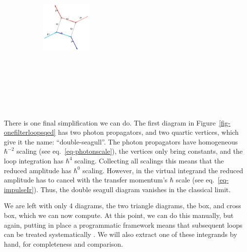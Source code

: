 \documentclass[
  11pt,
  a4paper,
  DIV=11,
  numbers=noendperiod,
  oneside]{scrreprt}
\DeclareRobustCommand{\[}{\begin{equation}}
\DeclareRobustCommand{\]}{\end{equation}}
\begin{document}
\begin{figure}
\begin{minipage}[t]{0.20\linewidth}
{\begin{figure}[H]
{}

\end{figure}

}

\end{minipage}%
%
\begin{minipage}[t]{0.20\linewidth}

{\centering 

\begin{figure}[H]

{\centering \includegraphics[width=1in,height=3.5in]{./scattering_files/figure-latex/dot-figure-5.png}

}

\end{figure}

}

\end{minipage}%

\end{figure}

There is one final simplification we can do. The first diagram in
Figure~\ref{fig-onefilterloopsqed} has two photon propagators, and two
quartic vertices, which give it the name: ``double-seagull''. The photon
propagators have homogeneous \(\hbar^{-2}\) scaling (see
eq.~\ref{eq-photonscale}), the vertices only bring constants, and the
loop integration has \(\hbar^4\) scaling. Collecting all scalings this
means that the reduced amplitude has \(\hbar^0\) scaling. However, in
the virtual integrand the reduced amplitude has to cancel with the
transfer momentum's \(\hbar\) scale (see eq.~\ref{eq-impulseIr}). Thus,
the double seagull diagram vanishes in the classical limit.

We are left with only 4 diagrams, the two triangle diagrams, the box,
and cross box, which we can now compute. At this point, we can do this
manually, but again, putting in place a programmatic framework means
that subsequent loops can be treated systematically . We will also extract one of these
integrands by hand, for completeness and comparison.
\end{document}
